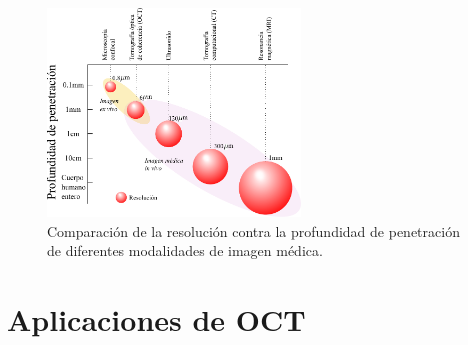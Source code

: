 \begin{figure}[ht!]
	\centering
	\includegraphics[width = 0.6\textwidth, keepaspectratio]{img/chap1/Carlos_oct_resolucion}
	\caption[Comparación de la resolución de distintas técnicas de imagen médica.]{Comparación de la resolución contra la profundidad de penetración de diferentes modalidades de imagen médica.}
	\label{fig:OCT_Ultrasound_microscopy}
\end{figure}




\section{Aplicaciones de OCT}


